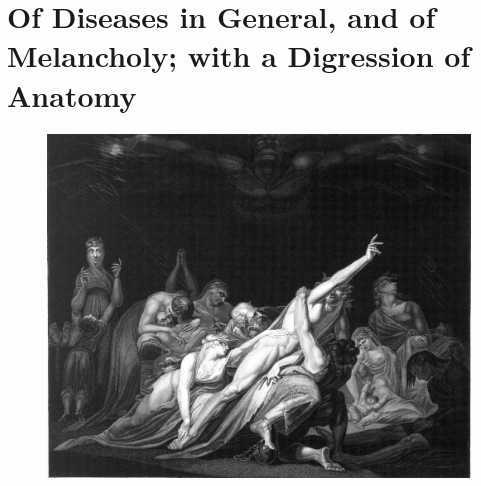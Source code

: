 \chapter[Of Diseases and Melancholy]{Of Diseases in General, and of Melancholy; with a Digression of Anatomy}
\begin{figure}[p]
  \begingroup
  \centering
  \includegraphics[keepaspectratio,width=\textwidth]{figures/v7cfk63b-small.jpg}
  \label{fig:deathlooms}
\end{figure}
